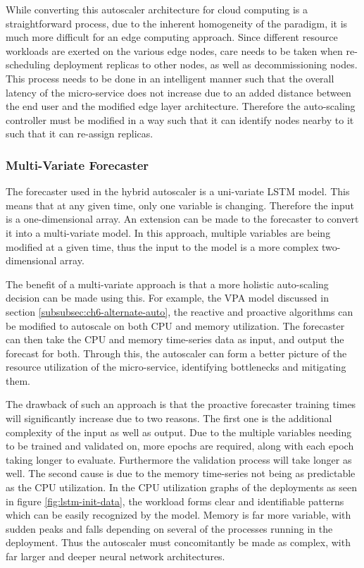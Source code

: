 While converting this autoscaler architecture for cloud computing is a straightforward process, due to the inherent homogeneity of the paradigm, it is much more difficult for an edge computing approach. Since different resource workloads are exerted on the various edge nodes, care needs to be taken when re-scheduling deployment replicas to other nodes, as well as decommissioning nodes. This process needs to be done in an intelligent manner such that the overall latency of the micro-service does not increase due to an added distance between the end user and the modified edge layer architecture. Therefore the auto-scaling controller must be modified in a way such that it can identify nodes nearby to it such that it can re-assign replicas.

\subsubsection{Multi-Variate Forecaster}
\label{subsubsec:ch6-multi-variate}

The forecaster used in the hybrid autoscaler is a uni-variate LSTM model. This means that at any given time, only one variable is changing. Therefore the input is a one-dimensional array. An extension can be made to the forecaster to convert it into a multi-variate model. In this approach, multiple variables are being modified at a given time, thus the input to the model is a more complex two-dimensional array.\par

The benefit of a multi-variate approach is that a more holistic auto-scaling decision can be made using this. For example, the VPA model discussed in section \ref{subsubsec:ch6-alternate-auto}, the reactive and proactive algorithms can be modified to autoscale on both CPU and memory utilization. The forecaster can then take the CPU and memory time-series data as input, and output the forecast for both. Through this, the autoscaler can form a better picture of the resource utilization of the micro-service, identifying bottlenecks and mitigating them.\par

The drawback of such an approach is that the proactive forecaster training times will significantly increase due to two reasons. The first one is the additional complexity of the input as well as output. Due to the multiple variables needing to be trained and validated on, more epochs are required, along with each epoch taking longer to evaluate. Furthermore the validation process will take longer as well. The second cause is due to the memory time-series not being as predictable as the CPU utilization. In the CPU utilization graphs of the deployments as seen in figure \ref{fig:lstm-init-data}, the workload forms clear and identifiable patterns which can be easily recognized by the model. Memory is far more variable, with sudden peaks and falls depending on several of the processes running in the deployment. Thus the autoscaler must concomitantly be made as complex, with far larger and deeper neural network architectures.\par

